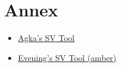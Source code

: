 \part{Annex}

\begin{itemize}
    \item \href{http://zardoru.github.io/sv-tools/}{Agka's SV Tool}
    \item \href{https://github.com/Eve-ning/amber}{Evening's SV Tool (amber)}
\end{itemize}
